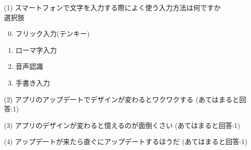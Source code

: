 (1) スマートフォンで文字を入力する際によく使う入力方法は何ですか\\

  選択肢
  
  \begin{enumerate}
  \setcounter{enumi}{-1}
  \setlength{\parskip}{0cm}
  \setlength{\itemsep}{0cm}
  \item フリック入力(テンキー)
  \item ローマ字入力
  \item 音声認識
  \item 手書き入力
\end{enumerate}

(2) アプリのアップデートでデザインが変わるとワクワクする (あてはまると回答:1)

(3) アプリのデザインが変わると憶えるのが面倒くさい (あてはまると回答:1)

(4) アップデートが来たら直ぐにアップデートするほうだ (あてはまると回答:1)


